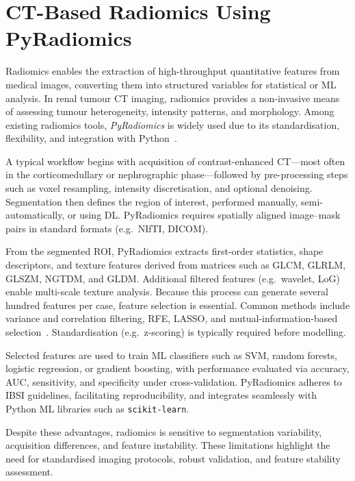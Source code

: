 \documentclass[final,british,a4paper,12pt]{phdthesis}
\begin{document}
\section{CT-Based Radiomics Using PyRadiomics}

Radiomics enables the extraction of high-throughput quantitative features from medical images, converting them into structured variables for statistical or ML analysis. In renal tumour CT imaging, radiomics provides a non-invasive means of assessing tumour heterogeneity, intensity patterns, and morphology. Among existing radiomics tools, \textit{PyRadiomics} is widely used due to its standardisation, flexibility, and integration with Python~\cite{Griethuysen:2017}.

A typical workflow begins with acquisition of contrast-enhanced CT—most often in the corticomedullary or nephrographic phase—followed by pre-processing steps such as voxel resampling, intensity discretisation, and optional denoising. Segmentation then defines the region of interest, performed manually, semi-automatically, or using DL. PyRadiomics requires spatially aligned image–mask pairs in standard formats (e.g.\ NIfTI, DICOM).

From the segmented ROI, PyRadiomics extracts first-order statistics, shape descriptors, and texture features derived from matrices such as GLCM, GLRLM, GLSZM, NGTDM, and GLDM. Additional filtered features (e.g.\ wavelet, LoG) enable multi-scale texture analysis. Because this process can generate several hundred features per case, feature selection is essential. Common methods include variance and correlation filtering, RFE, LASSO, and mutual-information-based selection~\cite{VS, RFE}. Standardisation (e.g.\ z-scoring) is typically required before modelling.

Selected features are used to train ML classifiers such as SVM, random forests, logistic regression, or gradient boosting, with performance evaluated via accuracy, AUC, sensitivity, and specificity under cross-validation. PyRadiomics adheres to IBSI guidelines, facilitating reproducibility, and integrates seamlessly with Python ML libraries such as \texttt{scikit-learn}.

Despite these advantages, radiomics is sensitive to segmentation variability, acquisition differences, and feature instability. These limitations highlight the need for standardised imaging protocols, robust validation, and feature stability assessment.

\end{document}
